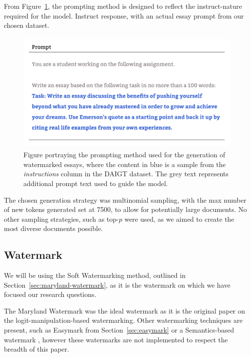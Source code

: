 \documentclass{l4proj}
\theoremstyle{definition}
\begin{document}
        From Figure~\ref{fig:prompting-method}, the prompting method is designed to reflect the instruct-nature required for the model. Instruct response, with an actual essay prompt from our chosen dataset.
        
        \begin{figure}[ht]
            \centering
            \includegraphics[height=6cm, width=1\linewidth, keepaspectratio]{images/methods/prompt-template.pdf}
            \caption{Figure portraying the prompting method used for the generation of watermarked essays, where the content in blue is a sample from the \emph{instructions} column in the DAIGT dataset. The grey text represents additional prompt text used to guide the model.}
            \label{fig:prompting-method}
        \end{figure}

        The chosen generation strategy was multinomial sampling, with the max number of new tokens generated set at 7500, to allow for potentially large documents. No other sampling strategies, such as top-$p$ were used, as we aimed to create the most diverse documents possible. 
        
    \subsection{Watermark}    
        \label{sec:watermark-implementation}
        We will be using the Soft Watermarking method, outlined in Section~\ref{sec:maryland-watermark}, as it is the watermark on which we have focused our research questions. 

        The Maryland Watermark was the ideal watermark as it is the original paper on the logit-manipulation-based watermarking. Other watermarking techniques are present, such as Easymark from Section~\ref{sec:easymark} or a Semantics-based watermark \citep{hou2024ksemstamp}, however these watermarks are not implemented to respect the breadth of this paper. 
\end{document}

